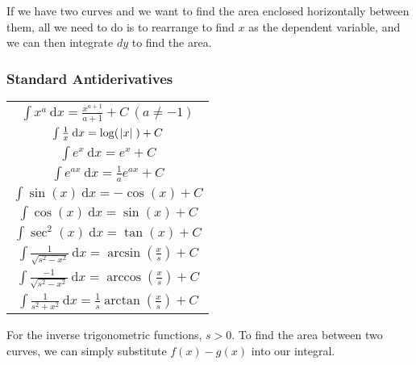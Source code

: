 \documentclass[12pt]{report}
\newcommand{\dx}{\:\mathrm{d}x}
\begin{document}
\begin{flushleft}
\bigskip
If we have two curves and we want to find the area enclosed horizontally 
between them, all we need to do is to rearrange to find \(x\) as the dependent
variable, and we can then integrate \(dy\) to find the area.

\subsubsection*{Standard Antiderivatives}
\begin{center}
    \begin{tabular}{||c||}
        \(\int x^a \dx = \frac{x^{a + 1}}{a + 1} + C \: (a \neq -1)\) \\[7pt]
        \(\int \frac{1}{x} \dx = \log(\;\abs{x}\;) + C\) \\[7pt]
        \(\int e^x \dx = e^x + C\) \\[7pt]
        \(\int e^{ax} \dx = \frac{1}{a}e^{ax} + C\) \\[7pt]
        \(\int \sin(x) \dx = -\cos(x) + C\) \\[7pt]
        \(\int \cos(x) \dx = \sin(x) + C\) \\[7pt]
        \(\int \sec^2(x) \dx = \tan(x) + C\) \\[7pt]
        \(\int \frac{1}{\sqrt{s^2 - x^2}} \dx = 
            \arcsin(\frac{x}{s}) + C\) \\[7pt]
        \(\int \frac{-1}{\sqrt{s^2 - x^2}} \dx = 
            \arccos(\frac{x}{s}) + C\) \\[7pt]
        \(\int \frac{1}{s^2 + x^2} \dx = 
            \frac{1}{s}\arctan(\frac{x}{s}) + C\) \\[7pt]
    \end{tabular}
\end{center}
For the inverse trigonometric functions, \(s > 0\). To find the area between
two curves, we can simply substitute \(f(x) - g(x)\) into our integral.


\end{flushleft}
\end{document}
